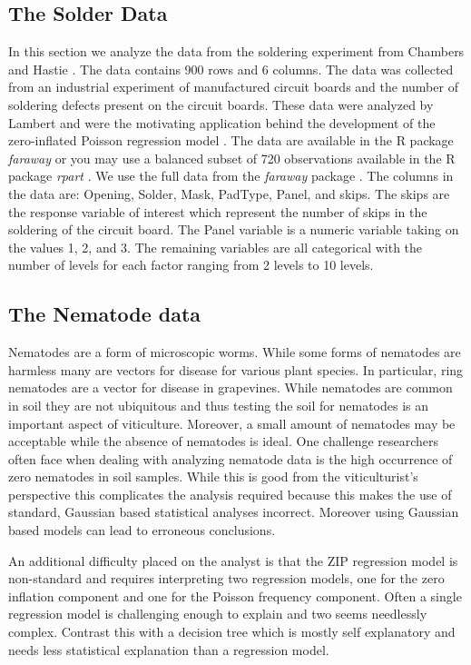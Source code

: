 \documentclass{article}
\begin{document}
\subsection{The Solder Data}
In this section we analyze the data from the soldering experiment from Chambers and Hastie \cite{chambers1991statistical}. The data contains 900 rows and 6 columns. The data was collected from an industrial experiment of manufactured circuit boards and the number of soldering defects present on the circuit boards. These data were analyzed by Lambert and were the motivating application behind the development of the zero-inflated Poisson regression model \cite{lambert1992zero}. The data are available in the R package \emph{faraway} or you may use a balanced subset of 720 observations available in the R package \emph{rpart} \cite{2015rpart}. We use the full data from the \emph{faraway} package \cite{faraway2016Rpack}. The columns in the data are:
Opening, Solder, Mask, PadType, Panel, and skips. The skips are the response variable of interest which represent the number of skips in the soldering of the circuit board. The Panel variable is a numeric variable taking on the values 1, 2, and 3. The remaining variables are all categorical with the number of levels for each factor ranging from 2 levels to 10 levels. 

\subsection{The Nematode data}

Nematodes are a form of microscopic worms. While some forms of nematodes are harmless many are vectors for disease for various plant species. In particular, ring nematodes  are a vector for disease in grapevines. While nematodes are common in soil they are not ubiquitous and thus testing the soil for nematodes is an important aspect of viticulture. Moreover, a small amount of nematodes may be acceptable while the absence of nematodes is ideal. One challenge researchers often face when dealing with analyzing nematode data is the high occurrence of zero nematodes in soil samples. While this is good from the viticulturist's perspective this complicates the analysis required because this makes the use of standard, Gaussian based statistical analyses incorrect. Moreover using Gaussian based models can lead to erroneous conclusions. 

An additional difficulty placed on the analyst is that the ZIP regression model is non-standard and requires interpreting two regression models, one for the zero inflation component and one for the Poisson frequency component. Often a single regression model is challenging enough to explain and two seems needlessly complex. Contrast this with a decision tree which is mostly self explanatory and needs less statistical explanation than a regression model. 
\end{document}
